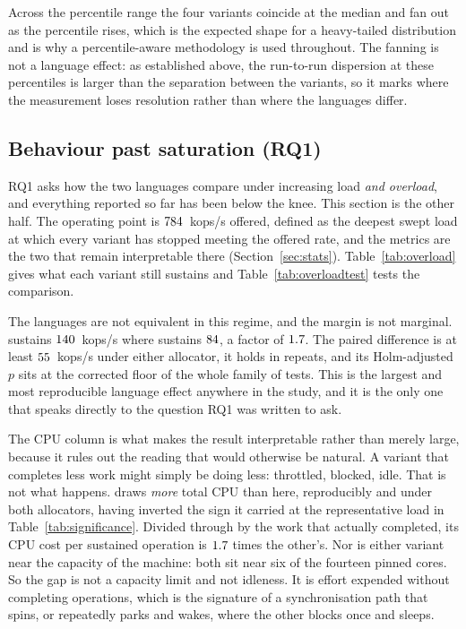 \documentclass[english,twoside,openright,a4paper,censored,csm,software-track-2020]{HYthesisML}
\begin{document}
Across the percentile range the four variants coincide at the median and fan out as the
percentile rises, which is the expected shape for a heavy-tailed distribution and is why a
percentile-aware methodology is used throughout. The fanning is not a language effect: as
established above, the run-to-run dispersion at these percentiles is larger than the separation
between the variants, so it marks where the measurement loses resolution rather than where the
languages differ.

\subsection{Behaviour past saturation (RQ1)}\label{sec:overload}
RQ1 asks how the two languages compare under increasing load \emph{and overload}, and everything
reported so far has been below the knee. This section is the other half. The operating point is
$784$~kops/s offered, defined as the deepest swept load at which every variant has
stopped meeting the offered rate, and the metrics are the two that remain interpretable there
(Section~\ref{sec:stats}). Table~\ref{tab:overload} gives what each variant still sustains and
Table~\ref{tab:overloadtest} tests the comparison.

The languages are not equivalent in this regime, and the margin is not marginal.
\OverloadSustainedFaster{} sustains $140$~kops/s where \OverloadSustainedSlower{}
sustains $84$, a factor of $1.7$. The paired difference is at least
$55$~kops/s under either allocator, it holds in \OverloadThrAgree{} repeats, and
its Holm-adjusted $p$ sits at the corrected floor of the whole family of \NTests{} tests. This is
the largest and most reproducible language effect anywhere in the study, and it is the only one
that speaks directly to the question RQ1 was written to ask.

The CPU column is what makes the result interpretable rather than merely large, because it rules
out the reading that would otherwise be natural. A variant that completes less work might simply
be doing less: throttled, blocked, idle. That is not what happens.
\OverloadSustainedSlower{} draws \emph{more} total CPU than \OverloadSustainedFaster{} here,
reproducibly and under both allocators, having inverted the sign it carried at the representative
load in Table~\ref{tab:significance}. Divided through by the work that actually completed, its
CPU cost per sustained operation is $1.7$ times the other's. Nor is either
variant near the capacity of the machine: both sit near six of the fourteen pinned cores. So the
gap is not a capacity limit and not idleness. It is effort expended without completing
operations, which is the signature of a synchronisation path that spins, or repeatedly parks and
wakes, where the other blocks once and sleeps.
\end{document}
